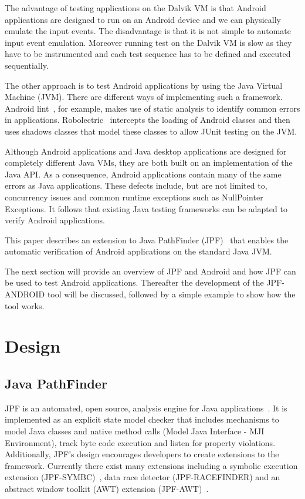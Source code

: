 \documentclass{acm_proc_article-sp}
\begin{document}
The advantage of testing applications on the Dalvik VM is that Android applications are designed to run on an Android
device and we can physically emulate the input events. The disadvantage is that it is not simple to automate input event emulation. Moreover
running test on the Dalvik VM is slow as they have to be instrumented and each test sequence has to be defined and executed sequentially.

The other approach is to test Android applications by using the Java Virtual Machine (JVM). There are different ways of implementing such
a framework. Android
lint~\cite{lint}, for example, makes use of static analysis to identify common errors in applications. Robolectric~\cite{robolectric}
intercepts the loading of Android classes and then uses shadows classes that model these classes to allow JUnit testing on the JVM.

Although Android applications and Java desktop applications are designed for completely different Java VMs, they are both
built on an implementation of the Java API. As a consequence, Android applications contain many of the
same errors as Java applications. These defects include, but are not limited to, concurrency issues and common runtime exceptions such as
NullPointer Exceptions. It follows that existing Java testing frameworks can be adapted to verify Android applications.

This paper describes an extension to Java PathFinder (JPF)~\cite{JPFDocs} that enables the automatic verification of Android applications on
the standard Java JVM. 

The next section will provide an overview of JPF and Android and how JPF can be used to test Android applications. Thereafter
the development of the JPF-ANDROID tool will be discussed, followed by a simple example to show how the tool works.


\section{Design}
\subsection{Java PathFinder}
JPF is an automated, open source, analysis engine for Java applications~\cite{JPFDocs}. It is implemented as an explicit state model checker
that includes mechanisms to model Java classes and native method calls (Model Java Interface - MJI Environment), track byte code execution
and
listen for property violations. Additionally, JPF's design encourages developers to create extensions to the framework. Currently there
exist many
extensions including a symbolic execution extension (JPF-SYMBC)~\cite{JPF-SYMB}, data race
detector (JPF-RACEFINDER) and an abstract window toolkit (AWT) extension (JPF-AWT)~\cite{JPF-AWT}.
\end{document}
